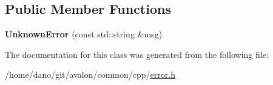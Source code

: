 \subsection*{Public Member Functions}
\begin{DoxyCompactItemize}
\item 
\mbox{\label{classtcf_1_1error_1_1UnknownError_a384248043a6807098e185f0a057b27ea}} 
{\bfseries Unknown\+Error} (const std\+::string \&msg)
\end{DoxyCompactItemize}


The documentation for this class was generated from the following file\+:\begin{DoxyCompactItemize}
\item 
/home/dano/git/avalon/common/cpp/\hyperlink{error_8h}{error.\+h}\end{DoxyCompactItemize}
